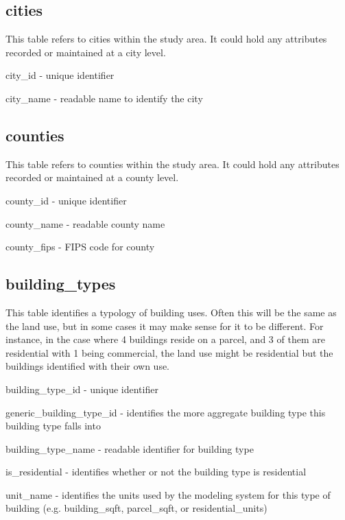 \subsection{cities} 

This table refers to cities within the study area. It could hold any attributes recorded or maintained at a city level.

\begin{description}
\item city\_id - unique identifier
\item city\_name - readable name to identify the city 
\end{description}

\subsection{counties} 

This table refers to counties within the study area. It could hold any attributes recorded or maintained at a county level.

\begin{description}
\item county\_id - unique identifier
\item county\_name - readable county name
\item county\_fips - FIPS code for county 
\end{description}

\subsection{building\_types} 

This table identifies a typology of building uses. Often this will be the same as the land use, but in some cases it may make sense for it to be different. For instance, in the case where 4 buildings reside on a parcel, and 3 of them are residential with 1 being commercial, the land use might be residential but the buildings identified with their own use.

\begin{description}
\item building\_type\_id - unique identifier
\item generic\_building\_type\_id - identifies the more aggregate building type this building type falls into
\item building\_type\_name - readable identifier for building type
\item is\_residential - identifies whether or not the building type is residential
\item unit\_name - identifies the units used by the modeling system for this type of building (e.g. building\_sqft, parcel\_sqft, or residential\_units) 
\end{description}


